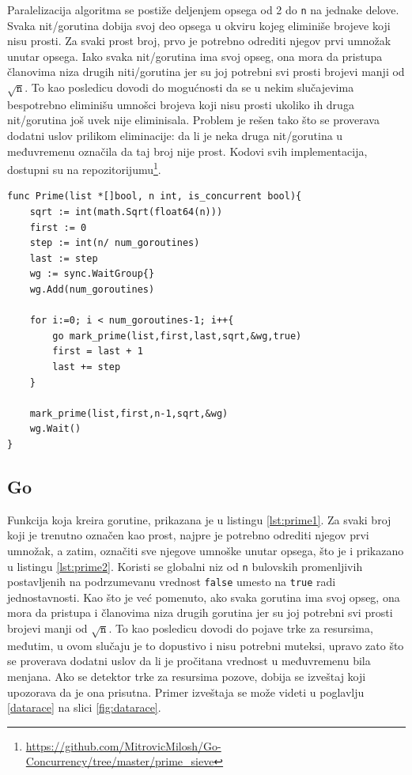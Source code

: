 \documentclass[12pt,oneside]{memoir}
\begin{document}
Paralelizacija algoritma se postiže deljenjem opsega od 2 do \texttt{n} na jednake delove. Svaka nit/gorutina dobija svoj deo opsega u okviru kojeg eliminiše brojeve koji nisu prosti. Za svaki prost broj, prvo je potrebno odrediti njegov prvi umnožak unutar opsega. Iako svaka nit/gorutina ima svoj opseg, ona mora da pristupa članovima niza drugih niti/gorutina jer su joj potrebni svi prosti brojevi manji od $\sqrt{\texttt{n}}$. To kao posledicu dovodi do mogućnosti da se u nekim slučajevima bespotrebno eliminišu umnošci brojeva koji nisu prosti ukoliko ih druga nit/gorutina još uvek nije eliminisala. Problem je rešen tako što se proverava dodatni uslov prilikom eliminacije: da li je neka druga nit/gorutina u međuvremenu označila da taj broj nije prost. Kodovi svih implementacija, dostupni su na repozitorijumu\footnote{\url{https://github.com/MitrovicMilosh/Go-Concurrency/tree/master/prime_sieve}}.

\begin{center}
\begin{lstlisting}[caption=Implementacija konkurentne funkcije za određivanje prostih brojeva manjih od n u jeziku Go,label={lst:prime1},backgroundcolor=\color{background}]
func Prime(list *[]bool, n int, is_concurrent bool){
	sqrt := int(math.Sqrt(float64(n)))
	first := 0
	step := int(n/ num_goroutines)
	last := step
	wg := sync.WaitGroup{}
	wg.Add(num_goroutines)

	for i:=0; i < num_goroutines-1; i++{
		go mark_prime(list,first,last,sqrt,&wg,true)
		first = last + 1
		last += step
	}

	mark_prime(list,first,n-1,sqrt,&wg)
	wg.Wait()
}
\end{lstlisting}
\end{center}

\subsection{Go}
Funkcija koja kreira gorutine, prikazana je u listingu \ref{lst:prime1}. Za svaki broj koji je trenutno označen kao prost, najpre je potrebno odrediti njegov prvi umnožak, a zatim, označiti sve njegove umnoške unutar opsega, što je i prikazano u listingu \ref{lst:prime2}. Koristi se globalni niz od \texttt{n} bulovskih promenljivih postavljenih na podrzumevanu vrednost \texttt{false} umesto na \texttt{true} radi jednostavnosti. Kao što je već pomenuto, ako svaka gorutina ima svoj opseg, ona mora da pristupa i članovima niza drugih gorutina jer su joj potrebni svi prosti brojevi manji od $\sqrt{\texttt{n}}$. To kao posledicu dovodi do pojave trke za resursima, međutim, u ovom slučaju je to dopustivo i nisu potrebni muteksi, upravo zato što se proverava dodatni uslov da li je pročitana vrednost u međuvremenu bila menjana. Ako se detektor trke za resursima pozove, dobija se izveštaj koji upozorava da je ona prisutna. Primer izveštaja se može videti u poglavlju \ref{datarace} na slici \ref{fig:datarace}. 
\end{document}
